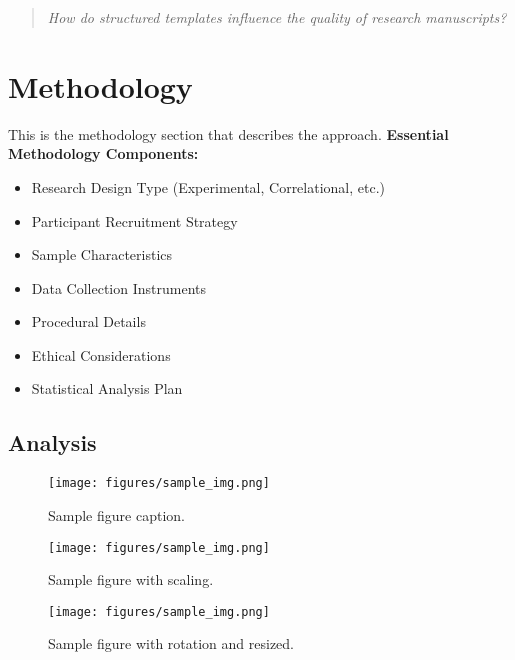 \documentclass[stu,12pt,floatsintext]{apa7}
\begin{document}
\begin{quote}
\textit{How do structured templates influence the quality of research manuscripts?}
\end{quote}

\section{Methodology}
This is the methodology section that describes the approach.
\textbf{Essential Methodology Components:}
\begin{itemize}
    \item Research Design Type (Experimental, Correlational, etc.)
    \item Participant Recruitment Strategy
    \item Sample Characteristics
    \item Data Collection Instruments
    \item Procedural Details
    \item Ethical Considerations
    \item Statistical Analysis Plan
\end{itemize}

\subsection{Analysis}

\begin{figure}[ht]
    \centering
    \texttt{[image: figures/sample\_img.png]}
    \caption{Sample figure caption.}
    \label{fig:writing_scores}
\end{figure}

\begin{figure}[ht]
    \centering
    \texttt{[image: figures/sample\_img.png]}
    \caption{Sample figure with scaling.}
    \label{fig:scaled_sample}
\end{figure}


\begin{figure}[ht]
    \centering
    \texttt{[image: figures/sample\_img.png]}
    \caption{Sample figure with rotation and resized.}
    \label{fig:rotated_sample}
\end{figure}
\end{document}
